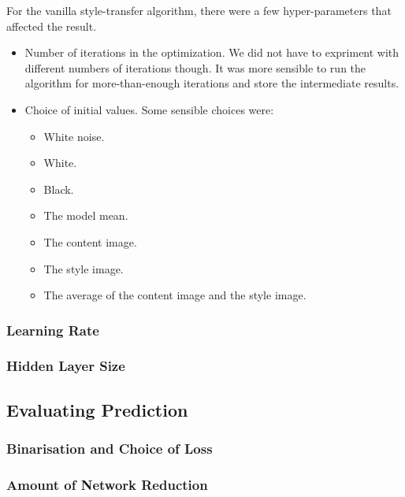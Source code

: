 \documentclass[runningheads]{llncs}
\begin{document}
For the vanilla style-transfer algorithm, there were a few hyper-parameters that 
affected the result.
\begin{itemize}
\item Number of iterations in the optimization. 
We did not have to expriment with different numbers of iterations though.
It was more sensible to run the algorithm for more-than-enough iterations and store the intermediate results.
\item Choice of initial values. Some sensible choices were:
\begin{itemize}
\item White noise.
\item White.
\item Black.
\item The model mean.
\item The content image.
\item The style image.
\item The average of the content image and the style image.
\end{itemize}
\end{itemize}


\subsubsection{Learning Rate}

\subsubsection{Hidden Layer Size}

\subsection{Evaluating Prediction}

\subsubsection{Binarisation and Choice of Loss}

\subsubsection{Amount of Network Reduction}
\end{document}
